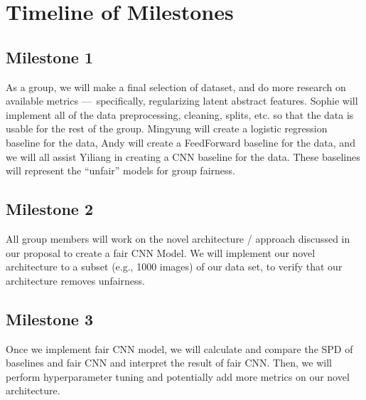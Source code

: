\documentclass{article}
\begin{document}
\section{Timeline of Milestones}
\subsection{Milestone 1}
As a group, we will make a final selection of dataset, and do more research on available metrics — specifically, regularizing latent abstract features. Sophie will implement all of the data preprocessing, cleaning, splits, etc. so that the data is usable for the rest of the group. Mingyung will create a logistic regression baseline   for the data, Andy will create a FeedForward baseline for the data, and we will all assist Yiliang in creating a CNN baseline for the data. These baselines will represent the “unfair” models for group fairness.
\subsection{Milestone 2}
All group members will work on the novel architecture / approach discussed in our proposal to create a fair CNN Model. We will implement our novel architecture to a subset (e.g., 1000 images) of our data set, to verify that our architecture removes unfairness.
\subsection{Milestone 3}
Once we implement fair CNN model, we will calculate and compare the SPD of baselines and fair CNN and interpret the result of fair CNN. Then, we will perform hyperparameter tuning and potentially add more metrics on our novel architecture.

\newpage


\end{document}
